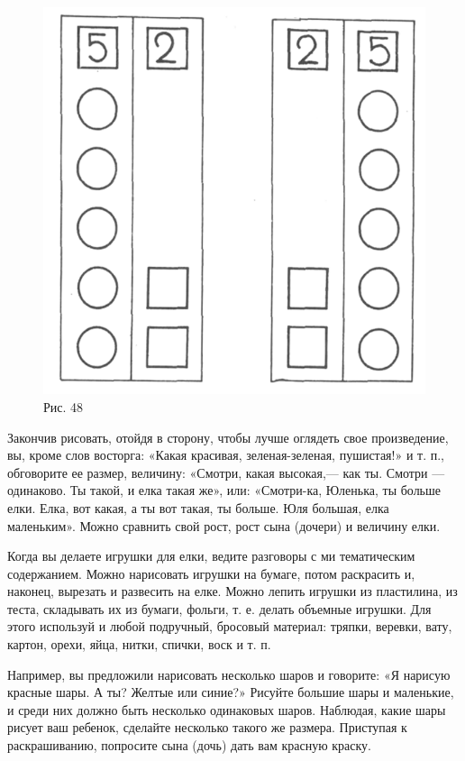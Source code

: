 \documentclass[a5paper]{book}
\begin{document}
\begin{figure}
\centering
\includegraphics[width=\linewidth]{media/media/image44.png}
\caption*{Рис. 48}
\end{figure}


Закончив рисовать, отойдя в сторону, чтобы лучше оглядеть свое
произведение, вы, кроме слов восторга: «Какая красивая, зеленая-зеленая,
пушистая!» и т. п., обговорите ее размер, величину: «Смотри, какая
высокая,--- как ты. Смотри --- одинаково. Ты такой, и елка такая же»,
или: «Смотри-ка, Юленька, ты больше елки. Елка, вот какая, а ты вот
такая, ты больше. Юля большая, елка маленьким». Можно сравнить свой
рост, рост сына (дочери) и величину елки.

Когда вы делаете игрушки для елки, ведите разговоры с ми тематическим
содержанием. Можно нарисовать игрушки на бумаге, потом раскрасить и,
наконец, вырезать и развесить на елке. Можно лепить игрушки из
пластилина, из теста, складывать их из бумаги, фольги, т. е. делать
объемные игрушки. Для этого используй и любой подручный, бросовый
материал: тряпки, веревки, вату, картон, орехи, яйца, нитки, спички,
воск и т. п.

Например, вы предложили нарисовать несколько шаров и говорите: «Я
нарисую красные шары. А ты? Желтые или синие?» Рисуйте большие шары и
маленькие, и среди них должно быть несколько одинаковых шаров. Наблюдая,
какие шары рисует ваш ребенок, сделайте несколько такого же размера.
Приступая к раскрашиванию, попросите сына (дочь) дать вам красную
краску.
\end{document}
